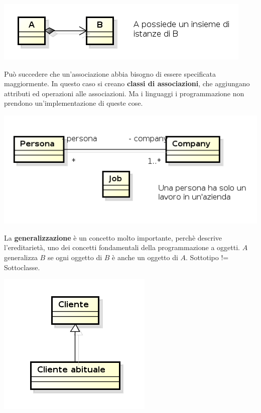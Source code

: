 \begin{center}

\includegraphics[width=0.75\columnwidth]{img13} %

\end{center}

Può succedere che un'associazione abbia bisogno di essere specificata maggiormente. In questo caso si creano \textbf{classi di associazioni}, che aggiungano attributi ed operazioni alle associazioni. Ma i linguaggi i programmazione non prendono un'implementazione di queste cose.

\begin{center}

\includegraphics[width=0.75\columnwidth]{img14} %

\end{center}

La \textbf{generalizzazione} è un concetto molto importante, perchè descrive l'ereditarietà, uno dei concetti fondamentali della programmazione a oggetti. $A$ generalizza $B$ se ogni oggetto di $B$ è anche un oggetto di $A$. Sottotipo != Sottoclasse.

\begin{center}

\includegraphics[width=0.75\columnwidth]{img15} %

\end{center}

